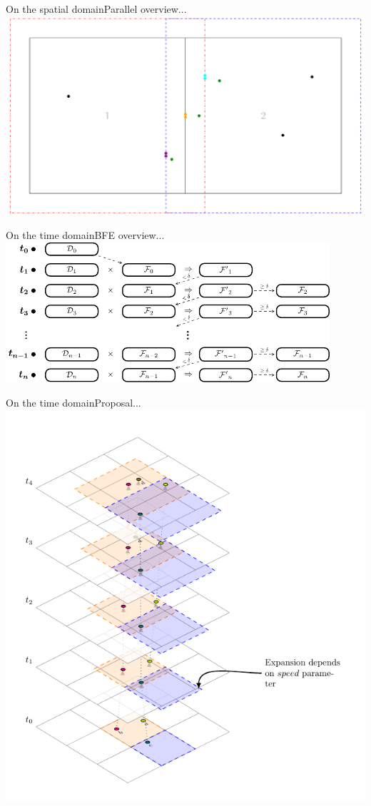 \documentclass{beamer}
\begin{document}
\begin{frame}{On the spatial domain}{Parallel overview...}
    \centering
    \includegraphics[page=4,width=\textwidth]{figures/merge}
\end{frame}

\begin{frame}{On the time domain}{BFE overview...}
    \centering
    \includegraphics[width=0.9\textwidth]{figures/FF_stages}
\end{frame}

\begin{frame}{On the time domain}{Proposal...}
    \centering
    \includegraphics[height=0.9\textheight]{figures/TemporalPartitioning}
\end{frame}
\end{document}
